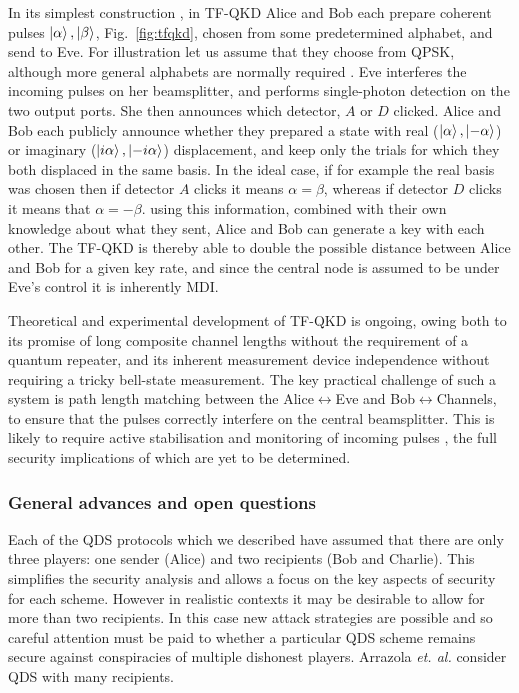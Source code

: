 In its simplest construction \cite{Barnett2019}, in TF-QKD Alice and Bob each prepare coherent pulses $\ket{\alpha}, \ket{\beta}$, Fig.~\ref{fig:tfqkd}, chosen from some predetermined alphabet, and send to Eve. For illustration let us assume that they choose from QPSK, although more general alphabets are normally required \cite{Curty2018, Cui2018}. Eve interferes the incoming pulses on her beamsplitter, and performs single-photon detection on the two output ports. She then announces which detector, $A$ or $D$ clicked. Alice and Bob each publicly announce whether they prepared a state with real ($\ket{\alpha}, \ket{-\alpha}$) or imaginary ($\ket{i \alpha}, \ket{- i \alpha}$) displacement, and keep only the trials for which they both displaced in the same basis. In the ideal case, if for example the real basis was chosen then if detector $A$ clicks it means $\alpha = \beta$, whereas if detector $D$ clicks it means that $\alpha = -\beta$. using this information, combined with their own knowledge about what they sent, Alice and Bob can generate a key with each other. The TF-QKD is thereby able to double the possible distance between Alice and Bob for a given key rate, and since the central node is assumed to be under Eve's control it is inherently MDI.

Theoretical and experimental development of TF-QKD is ongoing, owing both to its promise of long composite channel lengths without the requirement of a quantum repeater, and its inherent measurement device independence without requiring a tricky bell-state measurement. The key practical challenge of such a system is path length matching between the Alice$\leftrightarrow$Eve and Bob$\leftrightarrow$Channels, to ensure that the pulses correctly interfere on the central beamsplitter. This is likely to require active stabilisation and monitoring of incoming pulses \cite{Lucamarini2018}, the full security implications of which are yet to be determined.  


\subsubsection*{General advances and open questions}
Each of the QDS protocols which we described have assumed that there are only three players: one sender (Alice) and two recipients (Bob and Charlie). This simplifies the security analysis and allows a focus on the key aspects of security for each scheme. However in realistic contexts it may be desirable to allow for more than two recipients. In this case new attack strategies are possible and so careful attention must be paid to whether a particular QDS scheme remains secure against conspiracies of multiple dishonest players. Arrazola \emph{et. al.} \cite{Arrazola2015} consider QDS with many recipients. %

